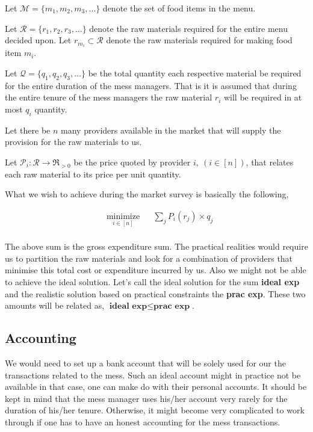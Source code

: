 \documentclass[12pt]{report}
\begin{document}
Let $\mathcal{M}=\{m_{1},m_{2},m_{3},\ldots\}$ denote the set of food items in the menu.


Let $\mathcal{R}=\{r_{1},r_{2},r_{3},\ldots\}$ denote the raw materials required for the entire menu decided upon. Let $r_{m_{i}}\subset \mathcal{R}$ denote the raw materials required for making food item $m_{i}$.


Let $\mathcal{Q}=\{q_{1},q_{2},q_{3},\ldots\}$ be the total quantity each respective material be required for the entire duration of the mess managers. That is it is assumed that during the entire tenure of the mess managers the raw material $r_{i}$ will be required in at most $q_{i}$ quantity.


Let there be $n$ many providers available in the market that will supply the provision for the raw materials to us.


Let $\mathcal{P}_{i} : \mathcal{R} \rightarrow \mathfrak{R}_{>0}$ be the price quoted by provider $i , ~( i \in [n])$, that relates each raw material to its price per unit quantity.


What we wish to achieve during the market survey is basically the following, 

\begin{equation*}
\begin{aligned}
& \underset{i \in [n]}{\text{minimize}}
& & \sum_{j} P_{i}(r_{j})\times q_{j}\\
\end{aligned}
\end{equation*}

The above sum is the gross expenditure sum. The practical realities would require us to partition the raw materials and look for a combination of providers that minimise this total cost or expenditure incurred by us. Also we might not be able to achieve the ideal solution. Let's call the ideal solution for the sum \textbf{ideal exp} and the realistic solution based on practical constraints the \textbf{prac exp}. These two amounts will be related as, $\textbf{ideal exp} \leq  \textbf{prac exp}$.

\subsection{Accounting}
We would need to set up a bank account that will be solely used for our the transactions related to the mess. Such an ideal account might in practice not be available in that case, one can make do with their personal accounts. It should be kept in mind that the mess manager uses his/her account very rarely for the duration of his/her tenure. Otherwise, it might become very complicated to work through if one has to have an honest accounting for the mess transactions.
\end{document}
